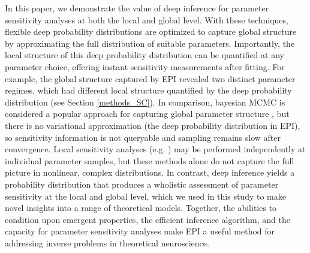 \documentclass[11pt]{article}
\begin{document}
In this paper, we demonstrate the value of deep inference for parameter sensitivity analyses at both the local and global level.
With these techniques, flexible deep probability distributions are optimized to capture global structure by approximating the full distribution of suitable parameters.
Importantly, the local structure of this deep probability distribution can be quantified at any parameter choice, offering instant sensitivity measurements after fitting.
For example, the global structure captured by EPI revealed two distinct parameter regimes, which had different local structure quantified by the deep probability distribution (see Section \ref{methods_SC}).
In comparison, bayesian MCMC is considered a popular approach for capturing global parameter structure \cite{girolami2011riemann}, but there is no variational approximation (the deep probability distribution in EPI), so sensitivity information is not queryable and sampling remains slow after convergence.
Local sensitivity analyses (e.g. \cite{raue2009structural}) may be performed independently at individual parameter samples, but these methods alone do not capture the full picture in nonlinear, complex distributions.
In contrast, deep inference yields a probability distribution that produces a wholistic assessment of parameter sensitivity at the local and global level, which we used in this study to make novel insights into a range of theoretical models.
Together, the abilities to condition upon emergent properties, the efficient inference algorithm, and the capacity for parameter sensitivity analyses make EPI a useful method for addressing inverse problems in theoretical neuroscience.
\end{document}
